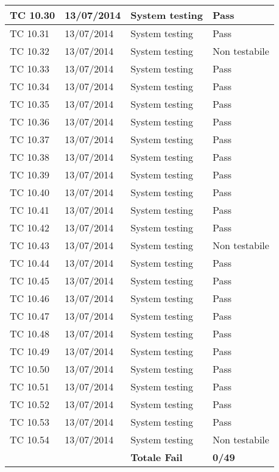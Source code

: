 \begin{longtable}{|p{3cm}|p{3cm}|p{3cm}|p{3cm}|}
	\hline
	TC 10.30		& 13/07/2014 			& System testing		& Pass \tabularnewline
	\hline
	TC 10.31		& 13/07/2014 			& System testing		& Pass \tabularnewline
	\hline
	TC 10.32		& 13/07/2014 			& System testing		& Non testabile \tabularnewline
	\hline
	TC 10.33		& 13/07/2014 			& System testing		& Pass \tabularnewline
	\hline
	TC 10.34		& 13/07/2014 			& System testing		& Pass \tabularnewline
	\hline
	TC 10.35		& 13/07/2014 			& System testing		& Pass \tabularnewline
	\hline
	TC 10.36		& 13/07/2014 			& System testing		& Pass \tabularnewline
	\hline
	TC 10.37		& 13/07/2014 			& System testing		& Pass \tabularnewline
	\hline
	TC 10.38		& 13/07/2014 			& System testing		& Pass \tabularnewline
	\hline
	TC 10.39		& 13/07/2014 			& System testing		& Pass \tabularnewline
	\hline
	TC 10.40		& 13/07/2014 			& System testing		& Pass \tabularnewline
	\hline
	TC 10.41		& 13/07/2014 			& System testing		& Pass \tabularnewline
	\hline
	TC 10.42		& 13/07/2014 			& System testing		& Pass \tabularnewline
	\hline
	TC 10.43		& 13/07/2014 			& System testing		& Non testabile \tabularnewline
	\hline
	TC 10.44		& 13/07/2014 			& System testing		& Pass \tabularnewline
	\hline
	TC 10.45		& 13/07/2014 			& System testing		& Pass \tabularnewline
	\hline
	TC 10.46		& 13/07/2014 			& System testing		& Pass \tabularnewline
	\hline
	TC 10.47		& 13/07/2014 			& System testing		& Pass \tabularnewline
	\hline
	TC 10.48		& 13/07/2014 			& System testing		& Pass \tabularnewline
	\hline
	TC 10.49		& 13/07/2014 			& System testing		& Pass \tabularnewline
	\hline
	TC 10.50		& 13/07/2014 			& System testing		& Pass \tabularnewline
	\hline
	TC 10.51		& 13/07/2014 			& System testing		& Pass \tabularnewline
	\hline
	TC 10.52		& 13/07/2014 			& System testing		& Pass \tabularnewline
	\hline
	TC 10.53		& 13/07/2014 			& System testing		& Pass \tabularnewline
	\hline
	TC 10.54		& 13/07/2014 			& System testing		& Non testabile \tabularnewline
	\hline
				&				& \textbf{Totale Fail}	& \textbf{0/49} \tabularnewline
	\hline
\end{longtable}